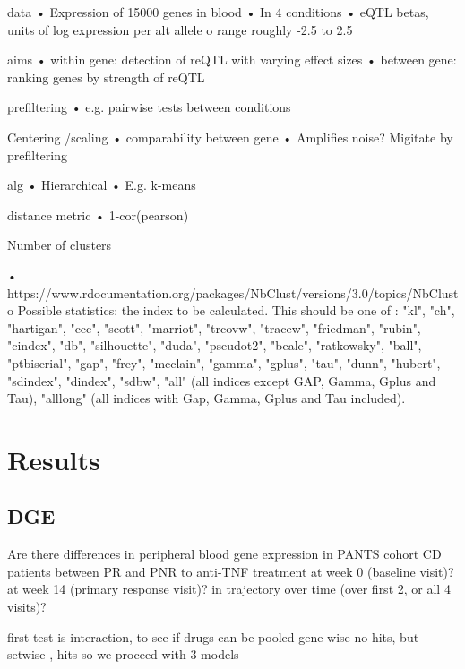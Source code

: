 \begin{outline}
data
•	Expression of 15000 genes in blood
•	In 4 conditions
•	eQTL betas, units of log expression per alt allele
o	range roughly -2.5 to 2.5

aims
•	within gene: detection of reQTL with varying effect sizes 
•	between gene: ranking genes by strength of reQTL

prefiltering
•	e.g. pairwise tests between conditions

Centering /scaling
•	comparability between gene
•	Amplifies noise? Migitate by prefiltering

alg
•	Hierarchical
•	E.g. k-means

distance metric
•	1-cor(pearson)

Number of clusters

•	https://www.rdocumentation.org/packages/NbClust/versions/3.0/topics/NbClust
o	Possible statistics: the index to be calculated. This should be one of : "kl", "ch", "hartigan", "ccc", "scott", "marriot", "trcovw", "tracew", "friedman", "rubin", "cindex", "db", "silhouette", "duda", "pseudot2", "beale", "ratkowsky", "ball", "ptbiserial", "gap", "frey", "mcclain", "gamma", "gplus", "tau", "dunn", "hubert", "sdindex", "dindex", "sdbw", "all" (all indices except GAP, Gamma, Gplus and Tau), "alllong" (all indices with Gap, Gamma, Gplus and Tau included).

\section{Results}

\subsection{DGE}

Are there differences in peripheral blood gene expression in PANTS cohort CD patients between PR and PNR to anti-TNF treatment
    at week 0 (baseline visit)?
    at week 14 (primary response visit)?
    in trajectory over time (over first 2, or all 4 visits)?

first test is interaction, to see if drugs can be pooled
    gene wise no hits, 
    but setwise , hits
    so we proceed with 3 models




\end{outline}
